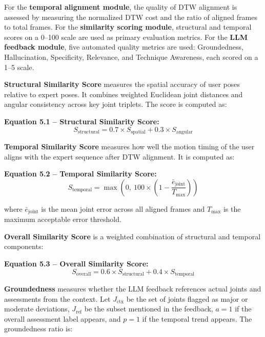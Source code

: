 \begin{sloppypar}
For the \textbf{temporal alignment module}, the quality of DTW alignment is assessed by measuring the normalized DTW cost and the ratio of aligned frames to total frames. For the \textbf{similarity scoring module}, structural and temporal scores on a 0--100 scale are used as primary evaluation metrics. For the \textbf{LLM feedback module}, five automated quality metrics are used: Groundedness, Hallucination, Specificity, Relevance, and Technique Awareness, each scored on a 1--5 scale.

\textbf{Structural Similarity Score} measures the spatial accuracy of user poses relative to expert poses. It combines weighted Euclidean joint distances and angular consistency across key joint triplets. The score is computed as:

\textbf{Equation 5.1 -- Structural Similarity Score:}
\begin{equation}
S_{\text{structural}} = 0.7 \times S_{\text{spatial}} + 0.3 \times S_{\text{angular}}
\tag{5.1}
\end{equation}

\textbf{Temporal Similarity Score} measures how well the motion timing of the user aligns with the expert sequence after DTW alignment. It is computed as:

\textbf{Equation 5.2 -- Temporal Similarity Score:}
\begin{equation}
S_{\text{temporal}} = \max\left(0,\ 100 \times \left(1 - \frac{\bar{e}_{\text{joint}}}{T_{\text{max}}}\right)\right)
\tag{5.2}
\end{equation}

\noindent where $\bar{e}_{\text{joint}}$ is the mean joint error across all aligned frames and $T_{\text{max}}$ is the maximum acceptable error threshold.

\textbf{Overall Similarity Score} is a weighted combination of structural and temporal components:

\textbf{Equation 5.3 -- Overall Similarity Score:}
\begin{equation}
S_{\text{overall}} = 0.6 \times S_{\text{structural}} + 0.4 \times S_{\text{temporal}}
\tag{5.3}
\end{equation}

\textbf{Groundedness} measures whether the LLM feedback references actual joints and assessments from the context. Let $J_{\text{ctx}}$ be the set of joints flagged as major or moderate deviations, $J_{\text{ref}}$ be the subset mentioned in the feedback, $a = 1$ if the overall assessment label appears, and $p = 1$ if the temporal trend appears. The groundedness ratio is:


\end{sloppypar}
